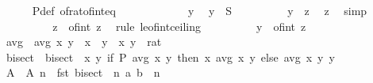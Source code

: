 \begin{isabellebody}
\ \ \ \ \isamarkupfalse%
\ P{\isacharunderscore}{\kern0pt}def\ of{\isacharunderscore}{\kern0pt}rat{\isacharunderscore}{\kern0pt}of{\isacharunderscore}{\kern0pt}int{\isacharunderscore}{\kern0pt}eq\isanewline
\ \ \ \ \isamarkupfalse%
\isanewline
\ \ \ \ \ \ \isamarkupfalse%
\ y\ \isamarkupfalse%
\ {\isachardoublequoteopen}y\ {\isasymin}\ S{\isachardoublequoteclose}\isanewline
\ \ \ \ \ \ \isamarkupfalse%
\ \isamarkupfalse%
\ {\isachardoublequoteopen}y\ {\isasymle}\ z{\isachardoublequoteclose}\ \isamarkupfalse%
\ z\ \isamarkupfalse%
\ simp\isanewline
\ \ \ \ \ \ \isamarkupfalse%
\ \isamarkupfalse%
\ {\isachardoublequoteopen}z\ {\isasymle}\ of{\isacharunderscore}{\kern0pt}int\ {\isasymlceil}z{\isasymrceil}{\isachardoublequoteclose}\ \isamarkupfalse%
\ {\isacharparenleft}{\kern0pt}rule\ le{\isacharunderscore}{\kern0pt}of{\isacharunderscore}{\kern0pt}int{\isacharunderscore}{\kern0pt}ceiling{\isacharparenright}{\kern0pt}\isanewline
\ \ \ \ \ \ \isamarkupfalse%
\ \isamarkupfalse%
\ {\isachardoublequoteopen}y\ {\isasymle}\ of{\isacharunderscore}{\kern0pt}int\ {\isasymlceil}z{\isasymrceil}{\isachardoublequoteclose}\ \isacommand{{\isachardot}{\kern0pt}}\isamarkupfalse%
\isanewline
\ \ \ \ \isamarkupfalse%
\isanewline
\ \ \isamarkupfalse%
\isanewline
\isanewline
\ \ \isamarkupfalse%
\ avg\ \ {\isachardoublequoteopen}avg\ x\ y\ {\isacharequal}{\kern0pt}\ x{\isacharslash}{\kern0pt}{}\ {\isacharplus}{\kern0pt}\ y{\isacharslash}{\kern0pt}{}{\isachardoublequoteclose}\ \ x\ y\ {\isacharcolon}{\kern0pt}{\isacharcolon}{\kern0pt}\ rat\isanewline
\ \ \isamarkupfalse%
\ bisect\ \ {\isachardoublequoteopen}bisect\ {\isacharequal}{\kern0pt}\ {\isacharparenleft}{\kern0pt}{\isasymlambda}{\isacharparenleft}{\kern0pt}x{\isacharcomma}{\kern0pt}\ y{\isacharparenright}{\kern0pt}{\isachardot}{\kern0pt}\ if\ P\ {\isacharparenleft}{\kern0pt}avg\ x\ y{\isacharparenright}{\kern0pt}\ then\ {\isacharparenleft}{\kern0pt}x{\isacharcomma}{\kern0pt}\ avg\ x\ y{\isacharparenright}{\kern0pt}\ else\ {\isacharparenleft}{\kern0pt}avg\ x\ y{\isacharcomma}{\kern0pt}\ y{\isacharparenright}{\kern0pt}{\isacharparenright}{\kern0pt}{\isachardoublequoteclose}\isanewline
\ \ \isamarkupfalse%
\ A\ \ {\isachardoublequoteopen}A\ n\ {\isacharequal}{\kern0pt}\ fst\ {\isacharparenleft}{\kern0pt}{\isacharparenleft}{\kern0pt}bisect\ {\isacharcircum}{\kern0pt}{\isacharcircum}{\kern0pt}\ n{\isacharparenright}{\kern0pt}\ {\isacharparenleft}{\kern0pt}a{\isacharcomma}{\kern0pt}\ b{\isacharparenright}{\kern0pt}{\isacharparenright}{\kern0pt}{\isachardoublequoteclose}\ \ n\isanewline

\end{isabellebody}

